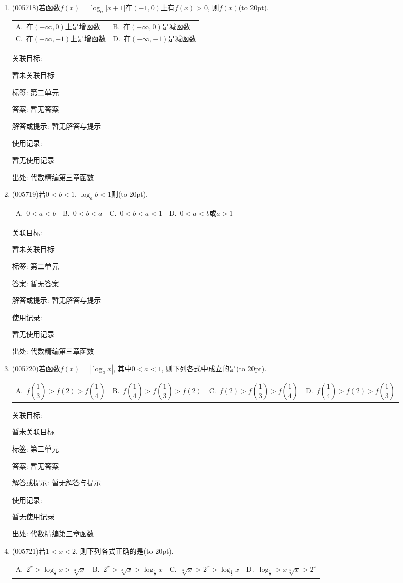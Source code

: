 \documentclass[10pt,a4paper]{article}
\newcommand{\bracket}[1]{(\hbox to #1pt{})}
\newcommand{\twoch}[4]{\par\begin{tabular}{p{.46\textwidth}p{.46\textwidth}}
A.~#1& B.~#2\\
C.~#3& D.~#4
\end{tabular}}
\newcommand{\fourch}[4]{\par\begin{tabular}{p{.23\textwidth}p{.23\textwidth}p{.23\textwidth}p{.23\textwidth}}
A.~#1 &B.~#2& C.~#3& D.~#4
\end{tabular}}
\begin{document}
\begin{enumerate}[1.]
关联目标:

暂未关联目标



标签: 第二单元

答案: 暂无答案

解答或提示: 暂无解答与提示

使用记录:

暂无使用记录


出处: 代数精编第三章函数
\item { (005718)}若函数$f(x)=\log_a|x+1|$在$(-1, 0)$上有$f(x)>0$, 则$f(x)$\bracket{20}.
\twoch{在$(-\infty ,0)$上是增函数}{在$(-\infty ,0)$是减函数}{在$(-\infty ,-1)$上是增函数}{在$(-\infty ,-1)$是减函数}


关联目标:

暂未关联目标



标签: 第二单元

答案: 暂无答案

解答或提示: 暂无解答与提示

使用记录:

暂无使用记录


出处: 代数精编第三章函数
\item { (005719)}若$0<b<1$, $\log_ab<1$则\bracket{20}.
\fourch{$0<a<b$}{$0<b<a$}{$0<b<a<1$}{$0<a<b$或$a>1$}


关联目标:

暂未关联目标



标签: 第二单元

答案: 暂无答案

解答或提示: 暂无解答与提示

使用记录:

暂无使用记录


出处: 代数精编第三章函数
\item { (005720)}若函数$f(x)=|\log_ax|$, 其中$0<a<1$, 则下列各式中成立的是\bracket{20}.
\fourch{$f(\dfrac 13)>f(2)>f(\dfrac 14)$}{$f(\dfrac 14)>f(\dfrac 13)>f(2)$}{$f(2)>f(\dfrac 13)>f(\dfrac 14)$}{$f(\dfrac 14)>f(2)>f(\dfrac 13)$}


关联目标:

暂未关联目标



标签: 第二单元

答案: 暂无答案

解答或提示: 暂无解答与提示

使用记录:

暂无使用记录


出处: 代数精编第三章函数
\item { (005721)}若$1<x<2$, 则下列各式正确的是\bracket{20}.
\fourch{$2^x>\log_{\frac 12}x>\sqrt[3]x$}{$2^x>\sqrt[3]x>\log_{\frac 12}x$}{$\sqrt[3]x>2^x>\log_{\frac 12}x$}{$\log_{\frac 12}>x\sqrt[3]x>2^x$}



\end{enumerate}
\end{document}
